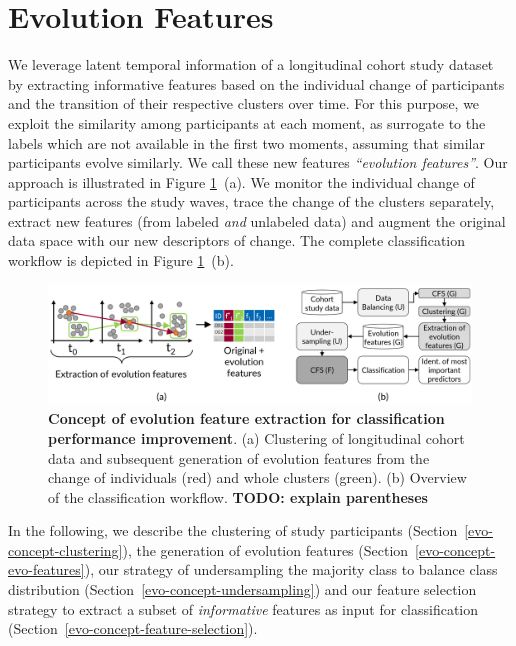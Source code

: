 \documentclass[
  oneside]{book}
\begin{document}
\hypertarget{evo-concept}{%
\section{Evolution Features}\label{evo-concept}}

We leverage latent temporal information of a longitudinal cohort study dataset by extracting informative features based on the individual change of participants and the transition of their respective clusters over time.
For this purpose, we exploit the similarity among participants at each moment, as surrogate to the labels which are not available in the first two moments, assuming that similar participants evolve similarly.
We call these new features \emph{``evolution features''}.
Our approach is illustrated in Figure \ref{fig:07-concept-workflow}~(a).
We monitor the individual change of participants across the study waves, trace the change of the clusters separately, extract new features (from labeled \emph{and} unlabeled data) and augment the original data space with our new descriptors of change.
The complete classification workflow is depicted in Figure \ref{fig:07-concept-workflow}~(b).



\begin{figure}

{\centering \includegraphics[width=1\linewidth]{figures/07-concept-workflow} 

}

\caption{\textbf{Concept of evolution feature extraction for classification performance improvement}. (a) Clustering of longitudinal cohort data and subsequent generation of evolution features from the change of individuals (red) and whole clusters (green). (b) Overview of the classification workflow. \textbf{TODO: explain parentheses}}\label{fig:07-concept-workflow}
\end{figure}

In the following, we describe the clustering of study participants (Section~\ref{evo-concept-clustering}), the generation of evolution features (Section~\ref{evo-concept-evo-features}), our strategy of undersampling the majority class to balance class distribution (Section~\ref{evo-concept-undersampling}) and our feature selection strategy to extract a subset of \emph{informative} features as input for classification (Section~\ref{evo-concept-feature-selection}).
\end{document}
